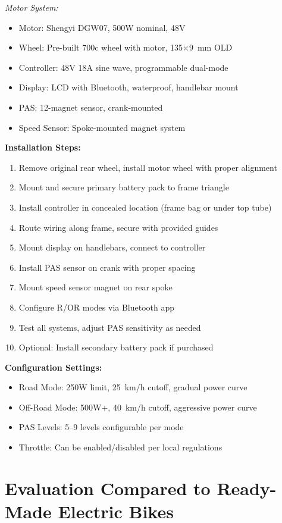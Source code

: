\documentclass[12pt,a4paper]{article}
\begin{document}
\textit{Motor System:}
\begin{itemize}
    \item Motor: Shengyi DGW07, 500W nominal, 48V
    \item Wheel: Pre-built 700c wheel with motor, 135×9~mm OLD
    \item Controller: 48V 18A sine wave, programmable dual-mode
    \item Display: LCD with Bluetooth, waterproof, handlebar mount
    \item PAS: 12-magnet sensor, crank-mounted
    \item Speed Sensor: Spoke-mounted magnet system
\end{itemize}

\textbf{Installation Steps:}
\begin{enumerate}
    \item Remove original rear wheel, install motor wheel with proper alignment
    \item Mount and secure primary battery pack to frame triangle
    \item Install controller in concealed location (frame bag or under top tube)
    \item Route wiring along frame, secure with provided guides
    \item Mount display on handlebars, connect to controller
    \item Install PAS sensor on crank with proper spacing
    \item Mount speed sensor magnet on rear spoke
    \item Configure R/OR modes via Bluetooth app
    \item Test all systems, adjust PAS sensitivity as needed
    \item Optional: Install secondary battery pack if purchased
\end{enumerate}

\textbf{Configuration Settings:}
\begin{itemize}
    \item Road Mode: 250W limit, 25~km/h cutoff, gradual power curve
    \item Off-Road Mode: 500W+, 40~km/h cutoff, aggressive power curve
    \item PAS Levels: 5--9 levels configurable per mode
    \item Throttle: Can be enabled/disabled per local regulations
\end{itemize}

\section{Evaluation Compared to Ready-Made Electric Bikes}
\end{document}
